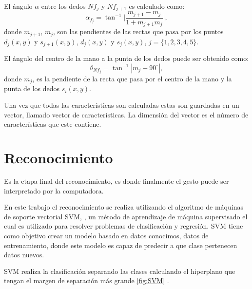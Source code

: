 El ángulo $\alpha$ entre los dedos $Nf_j$ y $Nf_{j+1}$ es calculado como:  
$$ \alpha_{f_j} = \tan^{-1}{ \bigg| \frac{m_{j+1}-m_j}{1+m_{j+1}m_j} \bigg|},$$
donde $m_{j+1}$, $m_j$, son las pendientes de las rectas que pasa por los puntos $d_j(x,y)$ y $s_{j+1}(x,y)$, $d_j(x,y)$ y $s_j(x,y)$, $j=\lbrace 1,2,3,4,5 \rbrace$.  

El ángulo del centro de la mano a la punta de los dedos puede ser obtenido como: 
$$ \theta_{Nf_j} = \tan^{-1} | {m_j} - 90^\circ |,$$
donde $m_j$, es la pendiente de la recta que pasa por el centro de la mano y la punta de los dedos $s_i(x,y)$.

Una vez que todas las características son calculadas estas son guardadas en un vector, llamado vector de características. La dimensión del vector es el número de características que este contiene. 


\section{Reconocimiento}\label{sec:SVM} 

Es la etapa final del reconocimiento, es donde finalmente el gesto puede ser interpretado por la computadora.  

En este trabajo el reconocimiento se realiza utilizando el algoritmo de máquinas de soporte vectorial SVM, \citep{Cortes1995}, un método de aprendizaje de máquina supervisado el cual es utilizado para resolver problemas de clasificación y regresión. SVM tiene como objetivo crear un modelo basado en datos conocimos, datos de entrenamiento, donde este modelo es capaz de predecir a que clase pertenecen datos nuevos. 

SVM realiza la clasificación separando las clases calculando el hiperplano que tengan el margen de separación más grande \ref{fig:SVM} .  

